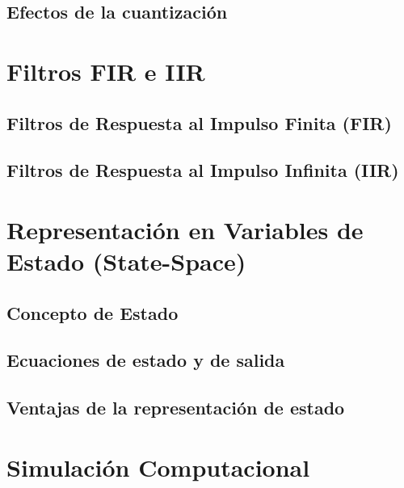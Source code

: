 \documentclass[11pt,a4paper,openany]{book}
\begin{document}
\section{Efectos de la cuantización}

\chapter{Filtros FIR e IIR}

\section{Filtros de Respuesta al Impulso Finita (FIR)}

\section{Filtros de Respuesta al Impulso Infinita (IIR)}



\chapter{Representación en Variables de Estado (State-Space)}

\section{Concepto de Estado}

\section{Ecuaciones de estado y de salida}

\section{Ventajas de la representación de estado}

\chapter{Simulación Computacional}
\end{document}
